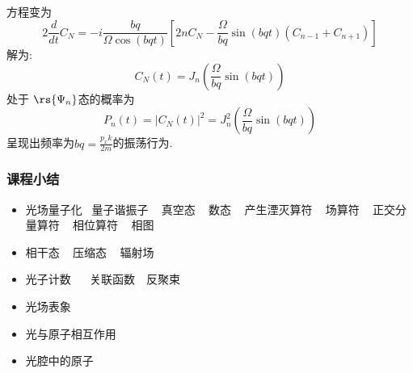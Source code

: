     \begin{frame} 
    \frametitle{}
        方程变为
        \[ 2\frac{d  }{d t} C_N = -i \frac{bq}{\Omega \cos (bqt) } \left[2n C_N - \frac{\Omega}{bq} \sin (bqt) (C_{n-1} + C_{n+1})\right]\]
        解为:
        \[C_N (t) = J_n (\frac{\Omega}{bq} \sin (bqt)) \]
        处于 $\rs{\Psi_n}$态的概率为
        \[P_n(t) = |C_N (t)|^2 = J^2 _n (\frac{\Omega}{bq} \sin (bqt))\]
        呈现出频率为$bq=\frac{p_x k}{2m} $的振荡行为.
    \end{frame}

    \begin{frame}
        \frametitle{课程小结}
        \begin{itemize}
            \item 光场量子化~ 量子谐振子 ~ 真空态 ~ 数态 ~ 产生湮灭算符 ~ 场算符 ~ 正交分量算符 ~ 相位算符 ~ 相图  
            \item 相干态 ~ 压缩态 ~ 辐射场  
            \item 光子计数 ~~ 关联函数~~反聚束
            \item 光场表象
            \item 光与原子相互作用
            \item 光腔中的原子
        \end{itemize}     
    \end{frame}